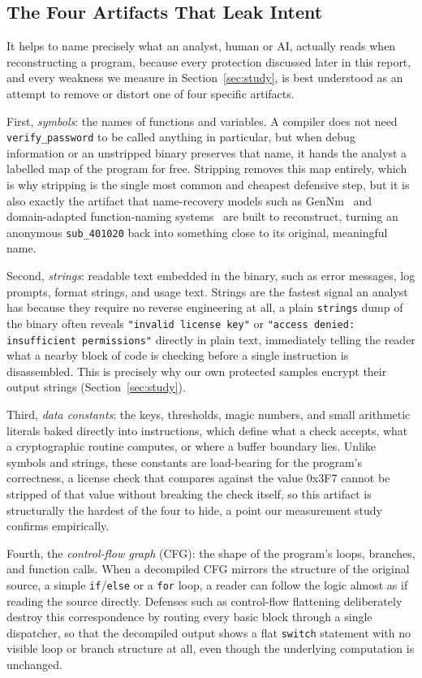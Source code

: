 \documentclass[conference]{IEEEtran}
\begin{document}
\subsection{The Four Artifacts That Leak Intent}
It helps to name precisely what an analyst, human or AI, actually reads when
reconstructing a program, because every protection discussed later in this report,
and every weakness we measure in Section~\ref{sec:study}, is best understood as an
attempt to remove or distort one of four specific artifacts.

First, \emph{symbols}: the names of functions and variables. A compiler does not
need \texttt{verify\_password} to be called anything in particular, but when
debug information or an unstripped binary preserves that name, it hands the
analyst a labelled map of the program for free. Stripping removes this map
entirely, which is why stripping is the single most common and cheapest defensive
step, but it is also exactly the artifact that name-recovery models such as
GenNm~\cite{gennm} and domain-adapted function-naming systems~\cite{funcname} are
built to reconstruct, turning an anonymous \texttt{sub\_401020} back into something
close to its original, meaningful name.

Second, \emph{strings}: readable text embedded in the binary, such as error
messages, log prompts, format strings, and usage text. Strings are the fastest
signal an analyst has because they require no reverse engineering at all, a plain
\texttt{strings} dump of the binary often reveals \texttt{"invalid license key"} or
\texttt{"access denied: insufficient permissions"} directly in plain text,
immediately telling the reader what a nearby block of code is checking before a
single instruction is disassembled. This is precisely why our own protected
samples encrypt their output strings (Section~\ref{sec:study}).

Third, \emph{data constants}: the keys, thresholds, magic numbers, and small
arithmetic literals baked directly into instructions, which define what a check
accepts, what a cryptographic routine computes, or where a buffer boundary lies.
Unlike symbols and strings, these constants are load-bearing for the program's
correctness, a license check that compares against the value 0x3F7 cannot be
stripped of that value without breaking the check itself, so this artifact is
structurally the hardest of the four to hide, a point our measurement study
confirms empirically.

Fourth, the \emph{control-flow graph} (CFG): the shape of the program's loops,
branches, and function calls. When a decompiled CFG mirrors the structure of the
original source, a simple \texttt{if}/\texttt{else} or a \texttt{for} loop, a
reader can follow the logic almost as if reading the source directly. Defenses
such as control-flow flattening deliberately destroy this correspondence by
routing every basic block through a single dispatcher, so that the decompiled
output shows a flat \texttt{switch} statement with no visible loop or branch
structure at all, even though the underlying computation is unchanged.
\end{document}
